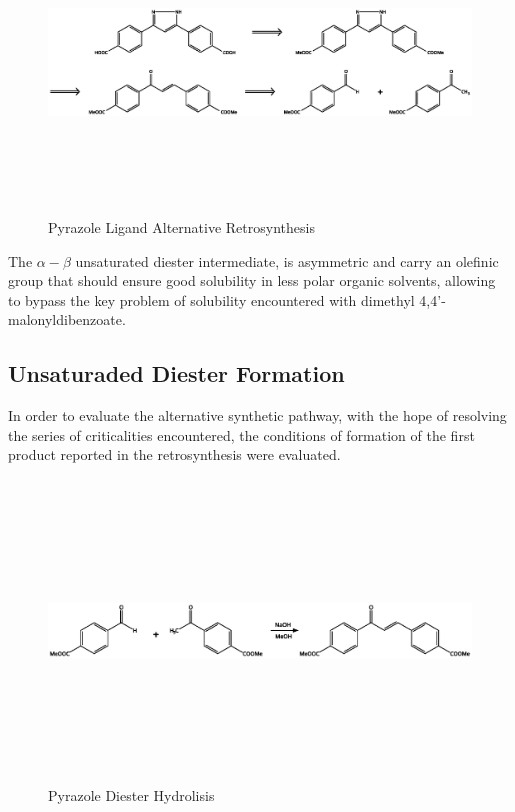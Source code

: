 \documentclass[../Master.tex]{subfiles}
\begin{document}
\begin{figure}[h!]
	\centering
	\includegraphics[width=16cm,height=8cm,keepaspectratio]{Structures/pyrazole-retro-alt.eps}
	\caption{Pyrazole Ligand Alternative Retrosynthesis}\label{fig:pyrazole-retro-alt}
\end{figure}

The \(\alpha-\beta\) unsaturated diester intermediate, is asymmetric and carry an olefinic group that should ensure good solubility in less polar organic solvents, allowing to bypass the key problem of solubility encountered with dimethyl 4,4’-malonyldibenzoate.

\subsection{Unsaturaded Diester Formation}\label{sec:alt-pyr-diest}

In order to evaluate the alternative synthetic pathway, with the hope of resolving the series of criticalities encountered, the conditions of formation of the first product reported in the retrosynthesis were evaluated.

\begin{figure}[h!]
	\centering
	\includegraphics[width=13cm,height=8cm,keepaspectratio]{Structures/unsaturated-synt.eps}
	\caption{Pyrazole Diester Hydrolisis}\label{fig:pyrazole-form}
\end{figure}
\end{document}
